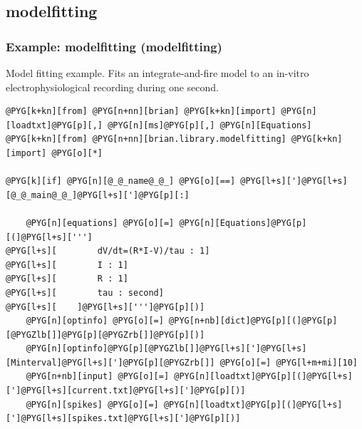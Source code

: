 \documentclass[letterpaper,10pt,english]{manual}
\begin{document}
\subsection{modelfitting}

\resetcurrentobjects
\hypertarget{--doc-examples-modelfitting_modelfitting}{}

\hypertarget{index-74}{}\subsubsection{Example: modelfitting (modelfitting)}

Model fitting example.
Fits an integrate-and-fire model to an in-vitro electrophysiological
recording during one second.

\begin{Verbatim}[commandchars=@\[\]]
@PYG[k+kn][from] @PYG[n+nn][brian] @PYG[k+kn][import] @PYG[n][loadtxt]@PYG[p][,] @PYG[n][ms]@PYG[p][,] @PYG[n][Equations]
@PYG[k+kn][from] @PYG[n+nn][brian.library.modelfitting] @PYG[k+kn][import] @PYG[o][*]

@PYG[k][if] @PYG[n][@_@_name@_@_] @PYG[o][==] @PYG[l+s][']@PYG[l+s][@_@_main@_@_]@PYG[l+s][']@PYG[p][:]

    @PYG[n][equations] @PYG[o][=] @PYG[n][Equations]@PYG[p][(]@PYG[l+s][''']
@PYG[l+s][        dV/dt=(R*I-V)/tau : 1]
@PYG[l+s][        I : 1]
@PYG[l+s][        R : 1]
@PYG[l+s][        tau : second]
@PYG[l+s][    ]@PYG[l+s][''']@PYG[p][)]
    @PYG[n][optinfo] @PYG[o][=] @PYG[n+nb][dict]@PYG[p][(]@PYG[p][@PYGZlb[]]@PYG[p][@PYGZrb[]]@PYG[p][)]
    @PYG[n][optinfo]@PYG[p][@PYGZlb[]]@PYG[l+s][']@PYG[l+s][Minterval]@PYG[l+s][']@PYG[p][@PYGZrb[]] @PYG[o][=] @PYG[l+m+mi][10]
    @PYG[n+nb][input] @PYG[o][=] @PYG[n][loadtxt]@PYG[p][(]@PYG[l+s][']@PYG[l+s][current.txt]@PYG[l+s][']@PYG[p][)]
    @PYG[n][spikes] @PYG[o][=] @PYG[n][loadtxt]@PYG[p][(]@PYG[l+s][']@PYG[l+s][spikes.txt]@PYG[l+s][']@PYG[p][)]


\end{Verbatim}
\end{document}
